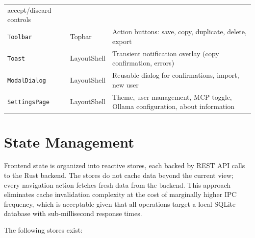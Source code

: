 \documentclass[a4paper, 11pt, oneside]{report}
\begin{document}
\begin{longtable}{l l L{7.5cm}}
                                                   accept/discard controls \\
  \texttt{Toolbar}          & Topbar            & Action buttons: save, copy, duplicate, delete, export \\
  \texttt{Toast}            & LayoutShell       & Transient notification overlay (copy confirmation, errors) \\
  \texttt{ModalDialog}      & LayoutShell       & Reusable dialog for confirmations, import, new user \\
  \texttt{SettingsPage}     & LayoutShell       & Theme, user management, MCP toggle, Ollama
                                                   configuration, about information \\
  \bottomrule
\end{longtable}

\section{State Management}
\label{sec:state-management}

Frontend state is organized into reactive stores, each backed by REST API
calls to the Rust backend.  The stores do not cache data beyond the current
view; every navigation action fetches fresh data from the backend.  This
approach eliminates cache invalidation complexity at the cost of marginally
higher IPC frequency, which is acceptable given that all operations target
a local SQLite database with sub-millisecond response times.

The following stores exist:
\end{document}
